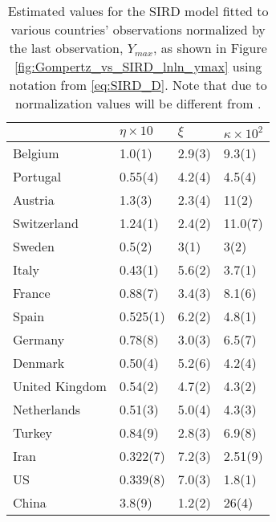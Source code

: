 \documentclass[review]{elsarticle}
\begin{document}
\begin{table}[H]
\centering
\caption{Estimated values for the SIRD model fitted to various countries' observations normalized by the last observation, $Y_{max}$, as shown in Figure \ref{fig:Gompertz_vs_SIRD_lnln_ymax} using notation from \ref{eq:SIRD_D}. Note that due to normalization values will be different from \citet{carletti2020covid}.}
\begin{tabular}{llll}
\toprule
{} &           $\eta\times 10$ &      $\xi$ &            $\kappa\times 10^{2}$ \\
\midrule
Belgium        &    1.0(1) &  2.9(3) &   9.3(1) \\
Portugal       &   0.55(4) &  4.2(4) &   4.5(4) \\
Austria        &    1.3(3) &  2.3(4) &    11(2) \\
Switzerland    &   1.24(1) &  2.4(2) &  11.0(7) \\
Sweden         &    0.5(2) &    3(1) &     3(2) \\
Italy          &   0.43(1) &  5.6(2) &   3.7(1) \\
France         &   0.88(7) &  3.4(3) &   8.1(6) \\
Spain          &  0.525(1) &  6.2(2) &   4.8(1) \\
Germany        &   0.78(8) &  3.0(3) &   6.5(7) \\
Denmark        &   0.50(4) &  5.2(6) &   4.2(4) \\
United Kingdom &   0.54(2) &  4.7(2) &   4.3(2) \\
Netherlands    &   0.51(3) &  5.0(4) &   4.3(3) \\
Turkey         &   0.84(9) &  2.8(3) &   6.9(8) \\
Iran           &  0.322(7) &  7.2(3) &  2.51(9) \\
US             &  0.339(8) &  7.0(3) &   1.8(1) \\
China          &    3.8(9) &  1.2(2) &    26(4) \\
\bottomrule
\end{tabular}

\end{table}
\end{document}
